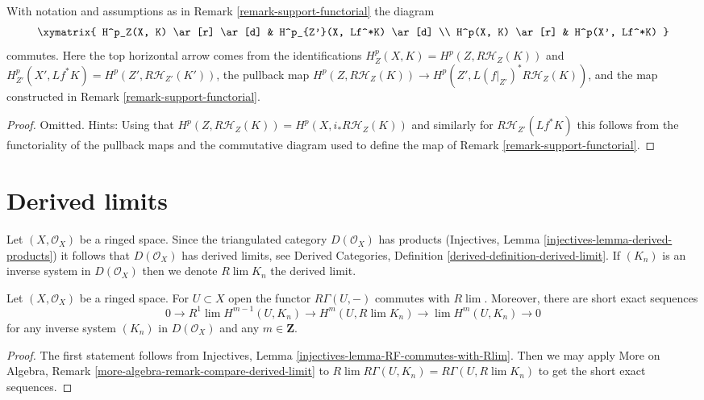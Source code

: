 \begin{lemma}
\label{lemma-support-functorial}
With notation and assumptions as in Remark \ref{remark-support-functorial}
the diagram
$$
\xymatrix{
H^p_Z(X, K) \ar[r] \ar[d] & H^p_{Z'}(X, Lf^*K) \ar[d] \\
H^p(X, K) \ar[r] & H^p(X', Lf^*K)
}
$$
commutes. Here the top horizontal arrow comes from the identifications
$H^p_Z(X, K) = H^p(Z, R\mathcal{H}_Z(K))$ and
$H^p_{Z'}(X', Lf^*K) = H^p(Z', R\mathcal{H}_{Z'}(K'))$,
the pullback map
$H^p(Z, R\mathcal{H}_Z(K)) \to H^p(Z', L(f|_{Z'})^*R\mathcal{H}_Z(K))$,
and the map constructed in Remark \ref{remark-support-functorial}.
\end{lemma}

\begin{proof}
Omitted. Hints:
Using that $H^p(Z, R\mathcal{H}_Z(K)) = H^p(X, i_*R\mathcal{H}_Z(K))$
and similarly for $R\mathcal{H}_{Z'}(Lf^*K)$ this follows from
the functoriality of the pullback maps and the commutative diagram
used to define the map of Remark \ref{remark-support-functorial}.
\end{proof}




\section{Derived limits}
\label{section-derived-limits}

\noindent
Let $(X, \mathcal{O}_X)$ be a ringed space. Since the triangulated category
$D(\mathcal{O}_X)$ has products
(Injectives, Lemma \ref{injectives-lemma-derived-products})
it follows that $D(\mathcal{O}_X)$ has derived limits, see
Derived Categories, Definition \ref{derived-definition-derived-limit}.
If $(K_n)$ is an inverse system in $D(\mathcal{O}_X)$ then we
denote $R\lim K_n$ the derived limit.

\begin{lemma}
\label{lemma-RGamma-commutes-with-Rlim}
Let $(X, \mathcal{O}_X)$ be a ringed space. For $U \subset X$ open the
functor $R\Gamma(U, -)$ commutes with $R\lim$. Moreover, there are
short exact sequences
$$
0 \to
R^1\lim H^{m - 1}(U, K_n) \to H^m(U, R\lim K_n) \to
\lim H^m(U, K_n) \to 0
$$
for any inverse system $(K_n)$ in $D(\mathcal{O}_X)$ and any $m \in \mathbf{Z}$.
\end{lemma}

\begin{proof}
The first statement follows from
Injectives, Lemma \ref{injectives-lemma-RF-commutes-with-Rlim}.
Then we may apply 
More on Algebra, Remark \ref{more-algebra-remark-compare-derived-limit}
to $R\lim R\Gamma(U, K_n) = R\Gamma(U, R\lim K_n)$ to get the short
exact sequences.
\end{proof}


